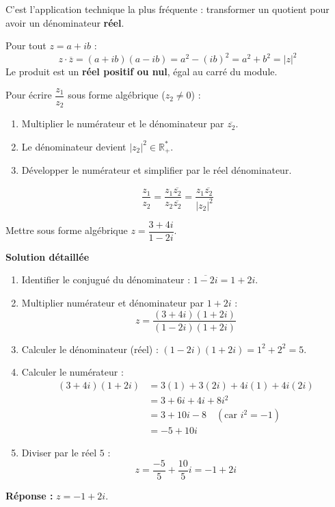 \documentclass[11pt]{article}
\begin{document}
C'est l'application technique la plus fréquente : transformer un quotient pour avoir un dénominateur \textbf{réel}.

\begin{propriete}
Pour tout $z = a + ib$ :
\[
z \cdot \overline{z} = (a+ib)(a-ib) = a^2 - (ib)^2 = a^2 + b^2 = |z|^2
\]
Le produit est un \textbf{réel positif ou nul}, égal au carré du module.
\end{propriete}

\begin{methode}
Pour écrire $\dfrac{z_1}{z_2}$ sous forme algébrique ($z_2 \neq 0$) :
\begin{enumerate}
    \item Multiplier le numérateur et le dénominateur par $\overline{z_2}$.
    \item Le dénominateur devient $|z_2|^2 \in \mathbb{R}^*_+$.
    \item Développer le numérateur et simplifier par le réel dénominateur.
\end{enumerate}
\[
\frac{z_1}{z_2} = \frac{z_1 \overline{z_2}}{z_2 \overline{z_2}} = \frac{z_1 \overline{z_2}}{|z_2|^2}
\]
\end{methode}

\begin{exoresolu}
Mettre sous forme algébrique $z = \dfrac{3+4i}{1-2i}$.

\medskip
\textbf{Solution détaillée}
\begin{enumerate}
    \item Identifier le conjugué du dénominateur : $\overline{1-2i} = 1+2i$.
    \item Multiplier numérateur et dénominateur par $1+2i$ :
    \[
    z = \frac{(3+4i)(1+2i)}{(1-2i)(1+2i)}
    \]
    \item Calculer le dénominateur (réel) : $(1-2i)(1+2i) = 1^2 + 2^2 = 5$.
    \item Calculer le numérateur :
    \begin{align*}
    (3+4i)(1+2i) &= 3(1) + 3(2i) + 4i(1) + 4i(2i) \\
    &= 3 + 6i + 4i + 8i^2 \\
    &= 3 + 10i - 8 \quad (\text{car } i^2 = -1) \\
    &= -5 + 10i
    \end{align*}
    \item Diviser par le réel $5$ :
    \[
    z = \frac{-5}{5} + \frac{10}{5}i = -1 + 2i
    \]
\end{enumerate}
\textbf{Réponse :} $z = -1 + 2i$.
\end{exoresolu}
\end{document}
